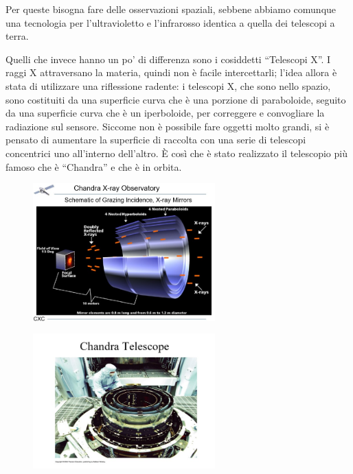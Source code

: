 Per queste bisogna fare delle osservazioni spaziali, sebbene abbiamo comunque una tecnologia per l'ultravioletto e l'infrarosso identica a quella dei telescopi a terra.

Quelli che invece hanno un po' di differenza sono i cosiddetti “Telescopi X”. I raggi X attraversano la materia, quindi non è facile intercettarli; l'idea allora è stata di utilizzare una riflessione radente: i telescopi X, che sono nello spazio, sono costituiti da una superficie curva che è una porzione di paraboloide, seguito da una superficie curva che è un iperboloide, per correggere e convogliare la radiazione sul sensore. Siccome non è possibile fare oggetti molto grandi, si è pensato di aumentare la superficie di raccolta con una serie di telescopi concentrici uno all'interno dell'altro. È così che è stato realizzato il telescopio più famoso che è “Chandra” e che è in orbita.

\begin{minipage}{0.5\textwidth}
    \begin{figure}[H]
        \centering
        \includegraphics[width=7cm]{36.jpg}
    \end{figure}
\end{minipage}
\begin{minipage}{0.5\textwidth}
    \begin{figure}[H]
        \centering
        \includegraphics[width=7cm]{37.jpg}
    \end{figure}
\end{minipage}

